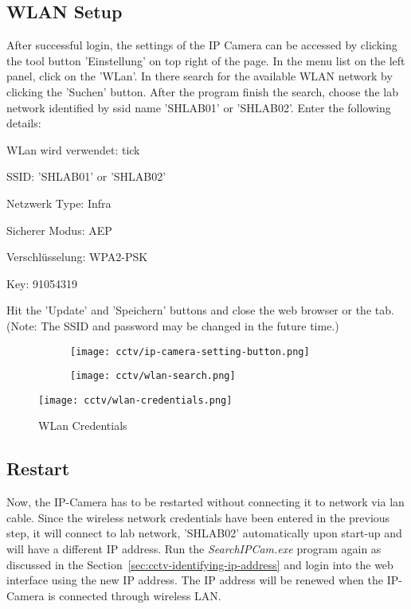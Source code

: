 \subsection*{WLAN Setup}
After successful login, the settings of the IP Camera can be accessed by clicking the tool button 'Einstellung' on top right of the page. In the menu list on the left panel, click on the 'WLan'. In there search for the available WLAN network by clicking the 'Suchen' button. After the program finish the search, choose the lab network identified by \ac{ssid} name 'SHLAB01' or 'SHLAB02'. Enter the following details:
\begin{itemize*}
\item WLan wird verwendet: tick
\item SSID: 'SHLAB01' or 'SHLAB02'
\item Netzwerk Type: Infra
\item Sicherer Modus: AEP
\item Verschl\"usselung: WPA2-PSK
\item Key: 91054319
\end{itemize*}
Hit the 'Update' and 'Speichern' buttons and close the web browser or the tab. (Note: The SSID and password may be changed in the future time.)
\begin{figure}[ht]
\caption{IP-Camera WLAN settings}
\label{ip-camera-wlan-settings}
\centering
	\begin{subfigure}{.34\textwidth}
	\texttt{[image: cctv/ip-camera-setting-button.png]}
	\end{subfigure}
	\begin{subfigure}{.63\textwidth}
	\texttt{[image: cctv/wlan-search.png]}
	\end{subfigure}
\end{figure}
\begin{figure}[ht]
\caption{WLan Credentials}
\label{wlan-credentials}
\centering
\texttt{[image: cctv/wlan-credentials.png]}
\end{figure}

\subsection*{Restart}
Now, the IP-Camera has to be restarted without connecting it to network via \ac{lan} cable. Since the wireless network credentials have been entered in the previous step, it will connect to lab network, 'SHLAB02' automatically upon start-up and will have a different IP address. Run the \emph{SearchIPCam.exe} program again as discussed in the Section~\ref{sec:cctv-identifying-ip-address} and login into the web interface using the new IP address. The IP address will be renewed when the IP-Camera is connected through wireless LAN.

